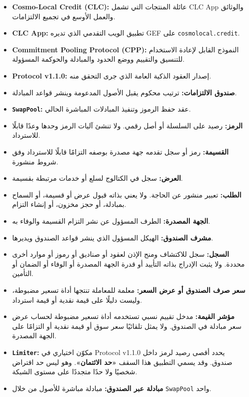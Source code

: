 \documentclass[11pt]{article}
\begin{document}
\begin{itemize}[leftmargin=*]
\item \textbf{Cosmo-Local Credit (CLC):} عائلة المنتجات التي تشمل CLC App والوثائق والعمل الأوسع في تجميع الالتزامات.
\item \textbf{CLC App:} تطبيق الويب التقدمي الذي تديره GEF على \texttt{cosmolocal.credit}.
\item \textbf{Commitment Pooling Protocol (CPP):} النموذج القابل لإعادة الاستخدام للتنسيق والتقييم ووضع الحدود والمبادلة والحوكمة المسؤولة.
\item \textbf{Protocol v1.1.0:} إصدار العقود الذكية العامة الذي جرى التحقق منه.
\item \textbf{صندوق الالتزامات:} ترتيب محكوم يقبل الأصول المدعومة وينشر قواعد المبادلة.
\item \textbf{\texttt{SwapPool}:} عقد حفظ الرموز وتنفيذ المبادلات المباشرة الحالي.
\item \textbf{الرمز:} رصيد على السلسلة أو أصل رقمي. ولا تنشئ آليات الرمز وحدها وعدًا قابلًا للاسترداد.
\item \textbf{القسيمة:} رمز أو سجل تقدمه جهة مصدرة بوصفه التزامًا قابلًا للاسترداد وفق شروط منشورة.
\item \textbf{العرض:} سجل في الكتالوج لسلع أو خدمات مرتبطة بقسيمة.
\item \textbf{الطلب:} تعبير منشور عن الحاجة. ولا يعني بذاته قبول عرض أو قسيمة، أو السماح بمبادلة، أو حجز مخزون، أو إنشاء التزام.
\item \textbf{الجهة المصدرة:} الطرف المسؤول عن نشر التزام القسيمة والوفاء به.
\item \textbf{مشرف الصندوق:} الهيكل المسؤول الذي ينشر قواعد الصندوق ويديرها.
\item \textbf{السجل:} سجل للاكتشاف ومنح الإذن لعقود أو صناديق أو رموز أو موارد أخرى محددة. ولا يثبت الإدراج بذاته التأييد أو قدرة الجهة المصدرة أو الوفاء أو الضمان أو التأمين.
\item \textbf{سعر صرف الصندوق أو عرض السعر:} معلمة للمعاملة تنتجها أداة تسعير مضبوطة، وليست دليلًا على قيمة نقدية أو قيمة استرداد.
\item \textbf{مؤشر القيمة:} مدخل تقييم نسبي تستخدمه أداة تسعير مضبوطة لحساب عرض سعر مبادلة في الصندوق. ولا يمثل تلقائيًا سعر سوق أو قيمة نقدية أو التزامًا على الجهة المصدرة.
\item \textbf{\texttt{Limiter}:} مكوّن اختياري في Protocol v1.1.0 يحدد أقصى رصيد لرمز داخل صندوق. وقد يسمي التطبيق هذا السقف \textbf{«حد الائتمان»}. وهو ليس حد اقتراض شخصيًا ولا حدًا متجددًا على مستوى الشبكة.
\item \textbf{مبادلة عبر الصندوق:} مبادلة مباشرة للأصول من خلال \texttt{SwapPool} واحد.

\end{itemize}
\end{document}
